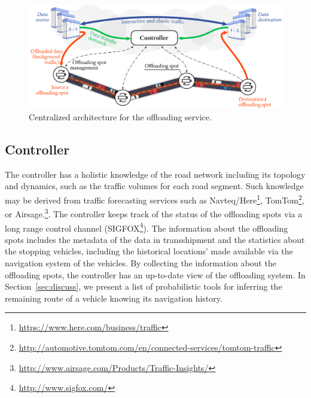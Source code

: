 \begin{figure}[t]
	\centering
	\includegraphics[width=0.75\columnwidth]{figures/architecture2.pdf}
	\caption{Centralized architecture for the offloading service.}
	\label{fig:architecture}
\end{figure}

\subsection{Controller}

The controller has a holistic knowledge of the road network including its topology and dynamics, such as the traffic volumes for each road segment. Such knowledge may be derived from traffic forecasting services such as Navteq/Here\footnote{\url{https://www.here.com/business/traffic}},     
TomTom\footnote{\url{http://automotive.tomtom.com/en/connected-services/tomtom-traffic}}, or 
Airsage.\footnote{\url{http://www.airsage.com/Products/Traffic-Insights/}}. The controller keeps track of the status of the offloading spots via a long range control channel (\eg SIGFOX\footnote{\url{http://www.sigfox.com/}}). The information about the offloading spots includes the metadata of the data in transshipment and the statistics about the stopping vehicles, including the historical locations' made available via the navigation system of the vehicles. By collecting the information about the offloading spots, the controller has an up-to-date view of the offloading system. In Section~\ref{sec:discuss}, we present a list of probabilistic tools for inferring the remaining route of a vehicle knowing its navigation history.       

